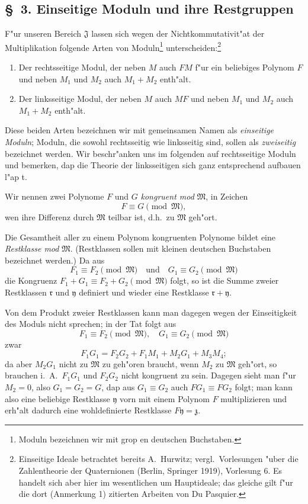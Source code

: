 \documentclass[12pt,a4paper]{article}
\begin{document}
\subsection*{\S\ 3. Einseitige Moduln und ihre Restgruppen}

F"ur unseren Bereich $\mathfrak{J}$ lassen sich wegen der Nichtkommutativit"at der Multiplikation folgende Arten von Moduln\footnote{Moduln bezeichnen wir mit grop en deutschen Buchstaben.} unterscheiden:\footnote{Einseitige Ideale betrachtet bereits A.\ Hurwitz; vergl.\ Vorlesungen "uber die Zahlentheorie der Quaternionen (Berlin, Springer 1919), Vorlesung 6. Es handelt sich aber hier im wesentlichen um Hauptideale; das gleiche gilt f"ur die dort (Anmerkung 1) zitierten Arbeiten von Du Pasquier.}

\begin{enumerate}
\item Der rechtsseitige Modul, der neben $M$ auch $FM$ f"ur ein beliebiges Polynom $F$ und neben $M_1$ und $M_2$ auch $M_1 + M_2$ enth"alt.
\item Der linksseitige Modul, der neben $M$ auch $MF$ und neben $M_1$ und $M_2$ auch $M_1 + M_2$ enth"alt.
\end{enumerate}

Diese beiden Arten bezeichnen wir mit gemeinsamen Namen als \emph{einseitige Moduln}; Moduln, die sowohl rechtsseitig wie linksseitig sind, sollen als \emph{zweiseitig} bezeichnet werden. Wir beschr"anken uns im folgenden auf rechtsseitige Moduln und bemerken, dap die Theorie der linksseitigen sich ganz entsprechend aufbauen l"ap t.

Wir nennen zwei Polynome $F$ und $G$ \emph{kongruent mod} $\mathfrak{M}$, in Zeichen
\[
F \equiv G \pmod{\mathfrak{M}},
\]
wen ihre Differenz durch $\mathfrak{M}$ teilbar ist, d.h.\ zu $\mathfrak{M}$ geh"ort.

Die Gesamtheit aller zu einem Polynom kongruenten Polynome bildet eine \emph{Restklasse mod} $\mathfrak{M}$. (Restklassen sollen mit kleinen deutschen Buchstaben bezeichnet werden.) Da aus
\[
F_1 \equiv F_2 \pmod{\mathfrak{M}} \quad \text{und} \quad G_1 \equiv G_2 \pmod{\mathfrak{M}}
\]
die Kongruenz $F_1 + G_1 \equiv F_2 + G_2 \pmod{\mathfrak{M}}$ folgt, so ist die Summe zweier Restklassen $\mathfrak{r}$ und $\mathfrak{y}$ definiert und wieder eine Restklasse $\mathfrak{r} + \mathfrak{y}$.

Von dem Produkt zweier Restklassen kann man dagegen wegen der Einseitigkeit des Moduls nicht sprechen; in der Tat folgt aus
\[
F_1 \equiv F_2 \pmod{\mathfrak{M}}, \quad G_1 \equiv G_2 \pmod{\mathfrak{M}}
\]
zwar
\[
F_1 G_1 = F_2 G_2 + F_1 M_1 + M_2 G_1 + M_3 M_4;
\]
da aber $M_2 G_1$ nicht zu $\mathfrak{M}$ zu geh"oren braucht, wenn $M_2$ zu $\mathfrak{M}$ geh"ort, so brauchen i.\ A.\ $F_1 G_1$ und $F_2 G_2$ nicht kongruent zu sein. Dagegen sieht man f"ur $M_2 = 0$, also $G_1 = G_2 = G$, dap aus $G_1 \equiv G_2$ auch $FG_1 \equiv FG_2$ folgt; man kann also eine beliebige Restklasse $\mathfrak{y}$ vorn mit einem Polynom $F$ multiplizieren und erh"alt dadurch eine wohldefinierte Restklasse $F\mathfrak{y} = \mathfrak{z}$.
\end{document}
